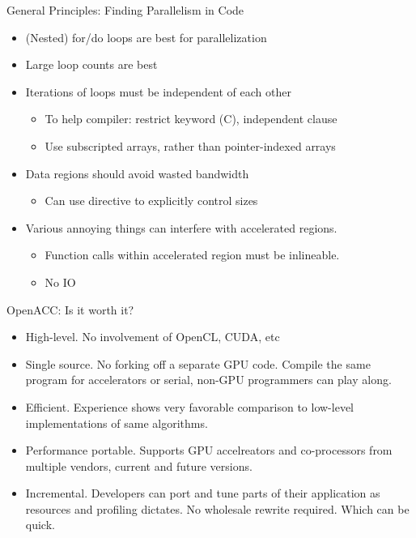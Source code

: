 \documentclass[c,mathserif,compress,xcolor=svgnames]{beamer}
\begin{document}
\begin{frame}{\small General Principles: Finding Parallelism in Code}
  \begin{itemize}
    \item (Nested) for/do loops are best for parallelization
    \item Large loop counts are best
    \item Iterations of loops must be independent of each other
    \begin{itemize}
      \item To help compiler: restrict keyword (C), independent clause
      \item Use subscripted arrays, rather than pointer-indexed arrays
    \end{itemize}
    \item Data regions should avoid wasted bandwidth
    \begin{itemize}
      \item Can use directive to explicitly control sizes
    \end{itemize}
    \item Various annoying things can interfere with accelerated regions.
    \begin{itemize}
      \item Function calls within accelerated region must be inlineable.
      \item No IO
    \end{itemize}
  \end{itemize}
\end{frame}

\begin{frame}{\small OpenACC: Is it worth it?}
  \begin{itemize}
    \item High-level. No involvement of OpenCL, CUDA, etc
    \item Single source. No forking off a separate GPU code. Compile the same program for accelerators or serial, non-GPU programmers can play along.
    \item Efficient. Experience shows very favorable comparison to low-level implementations of same algorithms.
    \item Performance portable. Supports GPU accelreators and co-processors from multiple vendors, current and future versions.
    \item Incremental. Developers can port and tune parts of their application as resources and profiling dictates. No wholesale rewrite required. Which can be quick.
  \end{itemize}
\end{frame}
\end{document}
